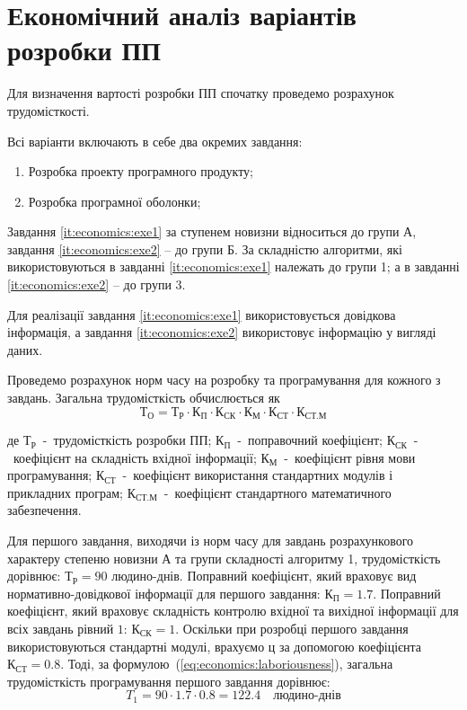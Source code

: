 \section{Економічний аналіз варіантів розробки ПП}

Для визначення вартості розробки ПП спочатку проведемо розрахунок трудомісткості. 

Всі варіанти включають в себе два окремих завдання:
\begin{enumerate}
	\item \label{it:economics:exe1}Розробка проекту програмного продукту;
	\item \label{it:economics:exe2}Розробка програмної оболонки; 
\end{enumerate}

Завдання \ref{it:economics:exe1} за ступенем новизни відноситься до групи А, завдання \ref{it:economics:exe2} – до групи Б. За складністю алгоритми, які використовуються в завданні \ref{it:economics:exe1} належать до групи 1; а в завданні \ref{it:economics:exe2} – до групи 3. 

Для реалізації завдання \ref{it:economics:exe1} використовується довідкова інформація, а завдання \ref{it:economics:exe2}  використовує інформацію у вигляді даних. 

Проведемо розрахунок норм часу на розробку та програмування для кожного з завдань. Загальна трудомісткість обчислюється як 
\newcommand{\coe}[2]{\text{#1}_\text{#2}}
\begin{equation}
	\label{eq:economics:laboriousness}
	\coe{Т}{О} = \coe{Т}{Р} 
	\cdot
	\coe{К}{П}
	\cdot
	\coe{К}{СК}
	\cdot
	\coe{К}{М}
	\cdot
	\coe{К}{СТ}
	\cdot
	\coe{К}{СТ.М}
\end{equation}

де $ \coe{Т}{Р} $~-~трудомісткість розробки ПП; $ \coe{К}{П} $~-~поправочний коефіцієнт; $ \coe{К}{СК} $~-~коефіцієнт на складність вхідної інформації; $ \coe{К}{М} $~-~коефіцієнт рівня мови програмування; $ \coe{К}{СТ} $~-~коефіцієнт використання стандартних модулів і прикладних програм; $ \coe{К}{СТ.М} $~-~коефіцієнт стандартного математичного забезпечення.

Для першого завдання, виходячи із норм часу для завдань розрахункового характеру степеню новизни А та групи складності алгоритму 1, трудомісткість дорівнює: $ \coe{Т}{Р} = 90 $ людино-днів. Поправний коефіцієнт, який враховує вид нормативно-довідкової інформації для першого завдання: $ \coe{К}{П} = 1.7 $. Поправний коефіцієнт, який враховує складність контролю вхідної та вихідної інформації для всіх завдань рівний $1$: $ \coe{К}{СК} = 1 $. Оскільки при розробці першого завдання використовуються стандартні модулі, врахуємо ц
за допомогою коефіцієнта $ \coe{К}{СТ} = 0.8 $. Тоді, за формулою~(\ref{eq:economics:laboriousness}), загальна трудомісткість програмування першого завдання дорівнює: 
\begin{equation*}
	T_1 = 90\cdot 1.7\cdot 0.8 = 122.4 \quad\text{людино-днів}
\end{equation*}

